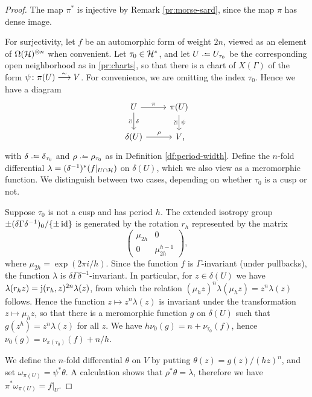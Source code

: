 \begin{proof}
 The map $\pi^*$ is injective by Remark \ref{pr:morse-sard}, since the map $\pi$ has dense image.

 For surjectivity, let $f$ be an automorphic form of weight $2n$, viewed as an element of $\Omega(\mathcal{H})^{\otimes n}$ when convenient. Let $\tau_0\in\mathcal{H}^*$, and let $U\defeq U_{\tau_0}$ be the corresponding open neighborhood as in \ref{pr:charts}, so that there is a chart of $X(\Gamma)$ of the form $\psi\colon \pi(U)\stackrel{\sim}{\longrightarrow} V$. For convenience, we are omitting the index $\tau_0$. Hence we have a diagram
 \[
 \begin{tikzcd}
  U \arrow{r}{\pi} \arrow{d}{\delta}[swap]{\rotatebox{90}{\(\simeq\)}} &
  \pi(U) \arrow{d}{\psi}[swap]{\rotatebox{90}{\(\simeq\)}} \\
  \delta(U) \arrow{r}{\rho} &
  V\rlap{,}
 \end{tikzcd}
 \]
 with $\delta\defeq\delta_{\tau_0}$ and $\rho\defeq\rho_{\tau_0}$ as in Definition \ref{df:period-width}. Define the $n$-fold differential $\lambda=(\delta^{-1})^*(f|_{U\cap\mathcal{H}})$ on $\delta(U)$, which we also view as a meromorphic function. We distinguish between two cases, depending on whether $\tau_0$ is a cusp or not.
 
 Suppose $\tau_0$ is not a cusp and has period $h$. The extended isotropy group $\pm(\delta\Gamma\delta^{-1})_0/\{\pm\operatorname{id}\}$ is generated by the rotation $r_h$ represented by the matrix
 \[\begin{pmatrix}\mu_{2h}&0\\0&\mu_{2h}^{h-1}\end{pmatrix},\]
 where $\mu_{2h}=\exp(2\pi i/h)$. Since the function $f$ is $\Gamma$-invariant (under pullbacks), the function $\lambda$ is $\delta\Gamma\delta^{-1}$-invariant. In particular, for $z\in\delta(U)$ we have $\lambda(r_h z)=\mathrm{j}(r_h,z)^{2n}\lambda(z)$, from which the relation $(\mu_h z)^n\lambda(\mu_h z)=z^n \lambda(z)$ follows. Hence the function $z\mapsto z^n\lambda(z)$ is invariant under the transformation $z\mapsto\mu_h z$, so that there is a meromorphic function $g$ on $\delta(U)$ such that $g(z^h)=z^n\lambda(z)$ for all $z$. We have $h\nu_0(g)=n+\nu_{\tau_0}(f)$, hence $\nu_0(g)=\nu_{\pi(\tau_0)}(f)+n/h$.
 
 We define the $n$-fold differential $\theta$ on $V$ by putting $\theta(z)=g(z)/(hz)^n$, and set $\omega_{\pi(U)}=\psi^*\theta$. A calculation shows that $\rho^*\theta=\lambda$, therefore we have $\pi^*\omega_{\pi(U)}=f|_U$.
 

\end{proof}
